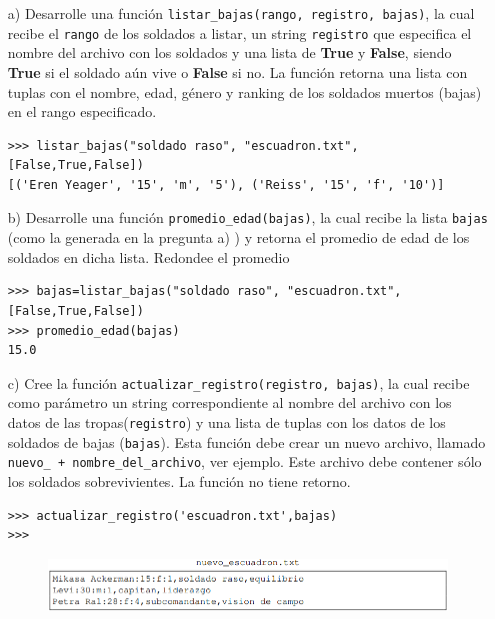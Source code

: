 \begin{itemize}
    \item[a)] Desarrolle una función \texttt{listar\_bajas(rango, registro, bajas)}, la cual recibe el \texttt{rango} de los soldados a listar, un string \texttt{registro} que especifica el nombre del archivo con los soldados y una lista de \textbf{True} y \textbf{False}, siendo \textbf{True} si el soldado aún vive o \textbf{False} si no. La función retorna una lista con tuplas con el nombre, edad, género y ranking de los soldados muertos (bajas) en el rango especificado.
    
    \begin{lstlisting}[style=consola]
>>> listar_bajas("soldado raso", "escuadron.txt", [False,True,False])
[('Eren Yeager', '15', 'm', '5'), ('Reiss', '15', 'f', '10')]
    \end{lstlisting}
    \item[b)] Desarrolle una función \texttt{promedio\_edad(bajas)}, la cual recibe la lista \texttt{bajas} (como la generada en la pregunta a) ) y retorna el promedio de edad de los soldados en dicha lista. Redondee el promedio
    
    \begin{lstlisting}[style=consola]
>>> bajas=listar_bajas("soldado raso", "escuadron.txt", [False,True,False])
>>> promedio_edad(bajas)
15.0
    \end{lstlisting}
    \item[c)] Cree la función \texttt{actualizar\_registro(registro, bajas)}, la cual recibe como parámetro un string correspondiente al nombre del archivo con los datos de las tropas(\texttt{registro}) y una lista de tuplas con los datos de los soldados de bajas (\texttt{bajas}). Esta función debe crear un nuevo archivo, llamado \texttt{nuevo\_ + nombre\_del\_archivo}, ver ejemplo. Este archivo debe contener sólo los soldados sobrevivientes. La función no tiene retorno.
    
    \begin{lstlisting}[style=consola]
>>> actualizar_registro('escuadron.txt',bajas)
>>> 
    \end{lstlisting}
    
    \begin{figure}[h]
        \centering
        \includegraphics[scale=0.8]{Imagenes/nuevoescuadron.png}
    \end{figure}
\end{itemize}